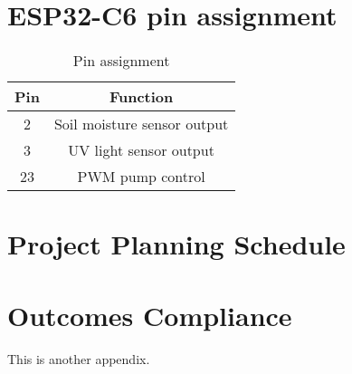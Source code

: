 \chapter{ESP32-C6 pin assignment}
\makeatletter{}\makeatother
\label{appen:derivations_bigramseg}

\begin{table}[!h]
    \centering
    \begin{tabular}{|c|c|}
        \hline
        Pin & Function \\
        \hline
        2 & Soil moisture sensor output \\
        3 & UV light sensor output \\
        23 & PWM pump control \\
        \hline
    \end{tabular}
    \caption{Pin assignment}
    \label{tab:pin_assignment}
\end{table}

\chapter{Project Planning Schedule}
\makeatletter{}\makeatother
\label{appen:derivations_bigramseg}



\chapter{Outcomes Compliance}
\makeatletter{}\makeatother
\label{appen:derivations_bigramseg}

This is another appendix.
